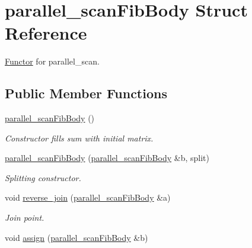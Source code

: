 \hypertarget{structparallel__scanFibBody}{}\section{parallel\+\_\+scan\+Fib\+Body Struct Reference}
\label{structparallel__scanFibBody}


\hyperlink{structFunctor}{Functor} for parallel\+\_\+scan.  


\subsection*{Public Member Functions}
\begin{DoxyCompactItemize}
\item 
\hypertarget{structparallel__scanFibBody_ad290d44ae21698548daa014c43d3cd1e}{}\hyperlink{structparallel__scanFibBody_ad290d44ae21698548daa014c43d3cd1e}{parallel\+\_\+scan\+Fib\+Body} ()\label{structparallel__scanFibBody_ad290d44ae21698548daa014c43d3cd1e}

\begin{DoxyCompactList}\small\item\em Constructor fills sum with initial matrix. \end{DoxyCompactList}\item 
\hypertarget{structparallel__scanFibBody_afd4fc9f90b72426b4ae8abe85b10baa7}{}\hyperlink{structparallel__scanFibBody_afd4fc9f90b72426b4ae8abe85b10baa7}{parallel\+\_\+scan\+Fib\+Body} (\hyperlink{structparallel__scanFibBody}{parallel\+\_\+scan\+Fib\+Body} \&b, split)\label{structparallel__scanFibBody_afd4fc9f90b72426b4ae8abe85b10baa7}

\begin{DoxyCompactList}\small\item\em Splitting constructor. \end{DoxyCompactList}\item 
\hypertarget{structparallel__scanFibBody_a0f3b7ee84548f0300ac414aff6695e85}{}void \hyperlink{structparallel__scanFibBody_a0f3b7ee84548f0300ac414aff6695e85}{reverse\+\_\+join} (\hyperlink{structparallel__scanFibBody}{parallel\+\_\+scan\+Fib\+Body} \&a)\label{structparallel__scanFibBody_a0f3b7ee84548f0300ac414aff6695e85}

\begin{DoxyCompactList}\small\item\em Join point. \end{DoxyCompactList}\item 
\hypertarget{structparallel__scanFibBody_a39ef5bd1e8f16b25b0fded0d08bbc7a5}{}void \hyperlink{structparallel__scanFibBody_a39ef5bd1e8f16b25b0fded0d08bbc7a5}{assign} (\hyperlink{structparallel__scanFibBody}{parallel\+\_\+scan\+Fib\+Body} \&b)\label{structparallel__scanFibBody_a39ef5bd1e8f16b25b0fded0d08bbc7a5}


\end{DoxyCompactItemize}
